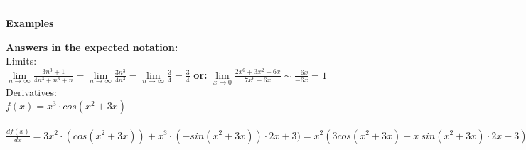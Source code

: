 \documentclass[12pt,a4paper]{report}
\begin{document}
	\rule{17cm}{1pt}
	
	\begin{center}\textbf{Examples}\end{center}
	
	\textbf{Answers in the expected notation:}\\
	Limits:\\
	$\lim\limits_{n \to \infty} \frac{3n^3 + 1}{4n^3+n^3+n} = \lim\limits_{n \to \infty} \frac{3n^3}{4n^3} = \lim\limits_{n \to \infty} \frac{3}{4} = \frac{3}{4}$
	\textbf{or:} $\lim\limits_{x \to 0} \frac{2x^6 + 3x^2 - 6x}{7x^6 - 6x} \sim \frac{-6x}{-6x} = 1$\\
	
	Derivatives:\\
	$f(x) = x^3 \cdot cos (x^2 + 3x)$\\\
	$\frac{df(x)}{dx} = 3x^2 \cdot (cos(x^2 + 3x)) + x^3 \cdot (-sin (x^2 + 3x)) \cdot 2x+3) = x^2 (3 cos(x^2+3x) - x \ sin(x^2 + 3x) \cdot 2x + 3)$\\
	
\end{document}
